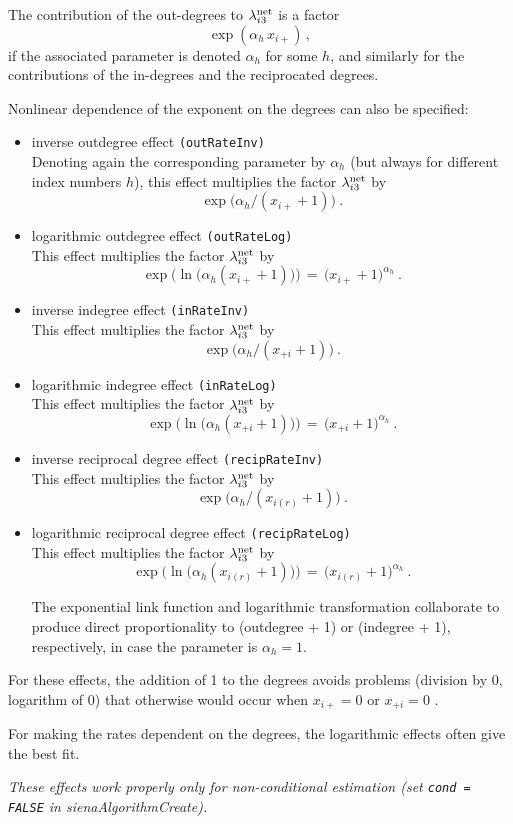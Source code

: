 \documentclass[a4paper,fleqn,11pt]{article}
\newcommand{\+}{\, + \,}
\newcommand{\sfn}[1]{\textsf{#1}}
\begin{document}
\begin{enumerate}
The contribution of the out-degrees to $\lambda^{\rm net}_{i3}$
is a factor
 \[ \exp( \alpha_h \, x_{i+})\,, \]
if the associated parameter is denoted $\alpha_h$ for some $h$,
and similarly for the contributions of the in-degrees and the
reciprocated degrees.

 Nonlinear dependence of the exponent on the degrees
 can also be specified:
 \begin{itemize}
 \item inverse outdegree effect  \texttt{(outRateInv)} \\
 Denoting again the corresponding parameter by $\alpha_h$
 (but always for different index numbers $h$),
 this effect multiplies the factor $\lambda^{\rm net}_{i3}$ by
 \[ \exp\big( \alpha_h / (x_{i+} +1)\big) \ . \]
 \item logarithmic outdegree effect  \texttt{(outRateLog)} \\
 This effect multiplies the factor $\lambda^{\rm net}_{i3}$ by
 \[ \exp\Big( \ln\big(\alpha_h (x_{i+} +1)\big)\Big) \,=\,
                 \big(x_{i+} +1\big)^{\alpha_h} \ . \]

 \item inverse indegree effect  \texttt{(inRateInv)} \\
 This effect multiplies the factor $\lambda^{\rm net}_{i3}$ by
 \[ \exp\big( \alpha_h / (x_{+i} +1)\big) \ . \]
 \item logarithmic indegree effect  \texttt{(inRateLog)} \\
 This effect multiplies the factor $\lambda^{\rm net}_{i3}$ by
 \[ \exp\Big( \ln\big(\alpha_h (x_{+i} +1)\big)\Big) \,=\,
                 \big(x_{+i} +1\big)^{\alpha_h} \ . \]


 \item inverse reciprocal degree effect  \texttt{(recipRateInv)} \\
 This effect multiplies the factor $\lambda^{\rm net}_{i3}$ by
 \[ \exp\big( \alpha_h / (x_{i(r)} +1)\big) \ . \]
 \item logarithmic reciprocal degree effect  \texttt{(recipRateLog)} \\
 This effect multiplies the factor $\lambda^{\rm net}_{i3}$ by
 \[ \exp\Big( \ln\big(\alpha_h (x_{i(r)} +1)\big)\Big) \,=\,
                 \big(x_{i(r)} +1\big)^{\alpha_h} \ . \]

 The exponential link function and logarithmic transformation collaborate
 to produce direct proportionality to (outdegree + 1) or (indegree + 1),
 respectively, in case the parameter is $\alpha_h=1$.
 \end{itemize}
 For these effects, the addition of 1 to the degrees avoids
 problems (division by 0, logarithm of 0) that otherwise would occur
 when $ x_{i+} = 0$ or $ x_{+i} = 0$ .

 For making the rates dependent on the degrees,
 the  logarithmic effects often give the best fit.

 \emph{These effects work properly only for non-conditional estimation
    (set \texttt{cond = FALSE} in \sfn{sienaAlgorithmCreate}).  }
\end{enumerate}
\end{document}
